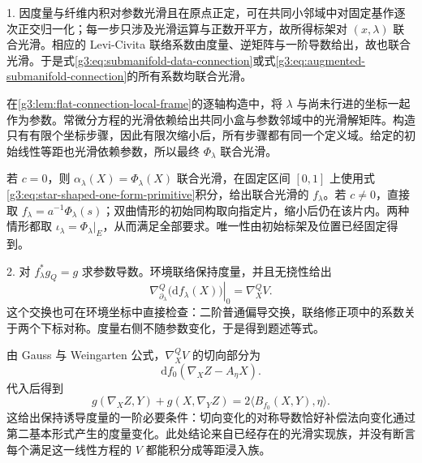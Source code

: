 \begin{solution}
	1. 因度量与纤维内积对参数光滑且在原点正定，可在共同小邻域中对固定基作逐次正交归一化；每一步只涉及光滑运算与正数开平方，故所得标架对 \((x,\lambda)\) 联合光滑。相应的 Levi-Civita 联络系数由度量、逆矩阵与一阶导数给出，故也联合光滑。于是式\eqref{g3:eq:submanifold-data-connection}或式\eqref{g3:eq:augmented-submanifold-connection}的所有系数均联合光滑。

	在\cref{g3:lem:flat-connection-local-frame}的逐轴构造中，将 \(\lambda\) 与尚未行进的坐标一起作为参数。常微分方程的光滑依赖给出共同小盒与参数邻域中的光滑解矩阵。构造只有有限个坐标步骤，因此有限次缩小后，所有步骤都有同一个定义域。给定的初始线性等距也光滑依赖参数，所以最终 \(\Phi_\lambda\) 联合光滑。

	若 \(c=0\)，则 \(\alpha_\lambda(X)=\Phi_\lambda(X)\) 联合光滑，在固定区间 \([0,1]\) 上使用式\eqref{g3:eq:star-shaped-one-form-primitive}积分，给出联合光滑的 \(f_\lambda\)。若 \(c\ne0\)，直接取 \(f_\lambda=a^{-1}\Phi_\lambda(s)\)；双曲情形的初始同构取向指定片，缩小后仍在该片内。两种情形都取 \(\iota_\lambda=\Phi_\lambda|_E\)，从而满足全部要求。唯一性由初始标架及位置已经固定得到。

	2. 对 \(f_\lambda^*g_Q=g\) 求参数导数。环境联络保持度量，并且无挠性给出
	\[
		\left.\nabla_{\partial_\lambda}^{Q}\bigl(\mathrm df_\lambda(X)\bigr)\right|_0
		=\nabla_X^{Q}V.
	\]
	这个交换也可在环境坐标中直接检查：二阶普通偏导交换，联络修正项中的系数关于两个下标对称。度量右侧不随参数变化，于是得到题述等式。

	由 Gauss 与 Weingarten 公式，\(\nabla_X^Q V\) 的切向部分为
	\[
		\mathrm df_0(\nabla_XZ-A_\eta X).
	\]
	代入后得到
	\[
		g(\nabla_XZ,Y)+g(X,\nabla_YZ)
		=2\langle B_{f_0}(X,Y),\eta\rangle.
	\]
	这给出保持诱导度量的一阶必要条件：切向变化的对称导数恰好补偿法向变化通过第二基本形式产生的度量变化。此处结论来自已经存在的光滑实现族，并没有断言每个满足这一线性方程的 \(V\) 都能积分成等距浸入族。
\end{solution}

